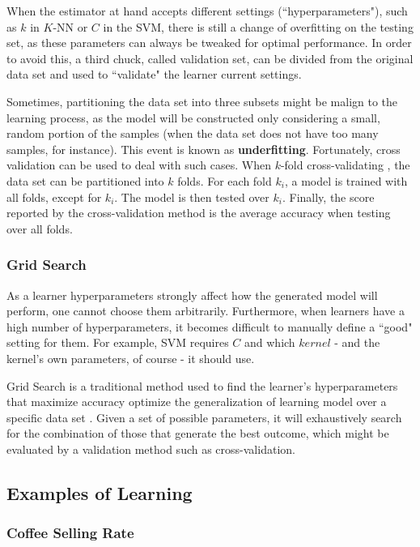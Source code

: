 When the estimator at hand accepts different settings (``hyperparameters"), such as $k$ in $K$-NN or $C$ in the SVM, there is still a change of overfitting on the testing set, as these parameters can always be tweaked for optimal performance. In order to avoid this, a third chuck, called validation set, can be divided from the original data set and used to ``validate" the learner current settings.

Sometimes, partitioning the data set into three subsets might be malign to the learning process, as the model will be constructed only considering a small, random portion of the samples (when the data set does not have too many samples, for instance). This event is known as \textbf{underfitting}. Fortunately, cross validation can be used to deal with such cases. When $k$-fold cross-validating \cite{crossvalid}, the data set can be partitioned into $k$ folds. For each fold $k_i$, a model is trained with all folds, except for $k_i$. The model is then tested over $k_i$. Finally, the score reported by the cross-validation method is the average accuracy when testing over all folds.

\subsubsection{Grid Search}

As a learner hyperparameters strongly affect how the generated model will perform, one cannot choose them arbitrarily. Furthermore, when learners have a high number of hyperparameters, it becomes difficult to manually define a ``good" setting for them. For example, SVM requires $C$ and which $kernel$ - and the kernel's own parameters, of course - it should use.

Grid Search is a traditional method used to find the learner's hyperparameters that maximize accuracy optimize the generalization of learning model over a specific data set \cite{gridsearch}. Given a set of possible parameters, it will exhaustively search for the combination of those that generate the best outcome, which might be evaluated by a validation method such as cross-validation.

\subsection{Examples of Learning}

\subsubsection{Coffee Selling Rate}

